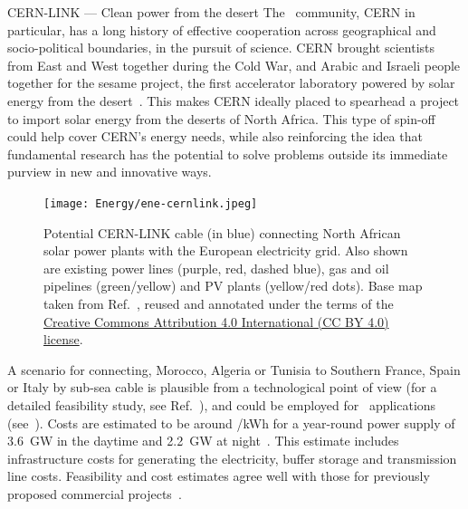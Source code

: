 \documentclass[../SustainableHEP.tex]{subfiles}
\begin{document}

\begin{casestudy}{CERN-LINK --- Clean power from the desert}%
The \ACR\ community, CERN in particular, has a long history of effective cooperation across geographical and socio-political boundaries, in the pursuit of science.  
CERN brought scientists from East and West together during the Cold War, and Arabic and Israeli people together for the \acrshort{sesame} project, the first accelerator laboratory powered by solar energy from the desert~\cite{Sesame}. This makes CERN ideally placed to spearhead a project to import solar energy from the deserts of North Africa.  This type of spin-off could help cover CERN's energy needs, while also reinforcing the idea that fundamental research has the potential to solve problems outside its immediate purview in new and innovative ways.\\


\begin{figure}
\captionsetup{type=figure}
     \texttt{[image: Energy/ene-cernlink.jpeg]}
     \caption[Map for CERN-LINK]{Potential CERN-LINK cable (in blue) connecting North African solar power plants with the European electricity grid. Also shown are existing power lines (purple, red, dashed blue), gas and oil pipelines (green/yellow) and PV plants (yellow/red dots). Base map taken from Ref.~\cite{OpenMap}, reused and annotated under the terms of the \href{https://creativecommons.org/licenses/by/4.0/}{Creative Commons Attribution 4.0 International (CC BY 4.0) license}.}
     \label{fig:ene-cernlink}
\end{figure}


A scenario for connecting, \eg Morocco, Algeria or Tunisia to Southern France, Spain or Italy by sub-sea cable is plausible from a technological point of view (for a detailed feasibility study, see Ref.~\cite{MoroccoHVDV}), and could be employed for \ACR\ applications (see~). Costs are estimated to be around /kWh for a year-round power supply of 3.6~GW in the daytime and 2.2~GW at night~\cite{Dueren, Dueren+2011+263+275, Hampp}. This estimate includes infrastructure costs for generating the electricity, buffer storage and transmission line costs. Feasibility and cost estimates agree well with those for previously proposed commercial projects~\cite{Xlinks}.


\end{casestudy}
\end{document}
